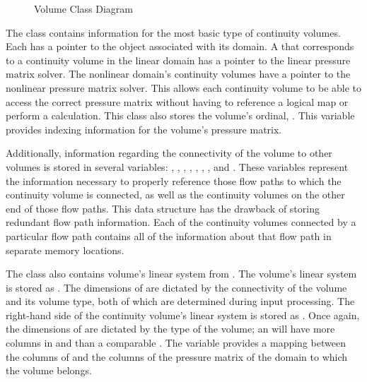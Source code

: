\begin{figure}[ht!]
\singlespace\centering

\caption{Volume Class Diagram}
\label{fig:volumeClassDiagram}
\end{figure}

The  class contains information for the most basic type of continuity volumes.
Each  has a pointer to the  object associated with its domain.
A  that corresponds to a continuity volume in the linear domain has a  pointer to the linear pressure matrix solver.
The nonlinear domain's continuity volumes have a  pointer to the nonlinear pressure matrix solver.
This allows each continuity volume to be able to access the correct pressure matrix without having to reference a logical map or perform a calculation.
This class also stores the volume's ordinal, .
This variable provides indexing information for the volume's pressure matrix.

Additionally, information regarding the connectivity of the volume to other volumes is stored in several variables: , , , , , , , and .
These variables represent the information necessary to properly reference those flow paths to which the continuity volume is connected, as well as the continuity volumes on the other end of those flow paths.
This data structure has the drawback of storing redundant flow path information.
Each of the continuity volumes connected by a particular flow path contains all of the information about that flow path in separate memory locations.

The  class also contains volume's linear system from .
The volume's linear system is stored as .
The dimensions of  are dictated by the connectivity of the volume and its volume type, both of which are determined during input processing.
The right-hand side of the continuity volume's linear system is stored as .
Once again, the dimensions of  are dictated by the type of the volume; an  will have more columns in  and  than a comparable .  
The variable  provides a mapping between the columns of  and the columns of the pressure matrix of the domain to which the volume belongs.

